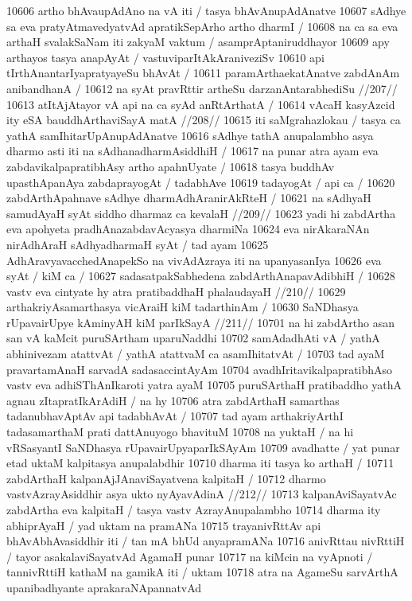 10606 artho bhAvaupAdAno na vA iti / tasya bhAvAnupAdAnatve  
10607 sAdhye sa eva pratyAtmavedyatvAd apratikSepArho artho dharmI /  
10608 na ca sa eva arthaH svalakSaNam iti zakyaM vaktum / asamprAptaniruddhayor
10609 apy arthayos tasya anapAyAt / vastuviparItAkAraniveziSv 
10610 api tIrthAnantarIyapratyayeSu bhAvAt /  
10611 	paramArthaekatAnatve zabdAnAm anibandhanA / 
10612 	na syAt pravRttir artheSu darzanAntarabhediSu //207//
10613 	atItAjAtayor vA api na ca syAd anRtArthatA / 
10614 	vAcaH kasyAzcid ity eSA bauddhArthaviSayA matA //208// 
10615 iti saMgrahazlokau / tasya ca yathA samIhitarUpAnupAdAnatve 
10616 sAdhye tathA anupalambho asya dharmo asti iti na sAdhanadharmAsiddhiH /
10617 na punar atra ayam eva zabdavikalpapratibhAsy artho apahnUyate /
10618 tasya buddhAv upasthApanAya zabdaprayogAt / tadabhAve  
10619 tadayogAt / api ca / 
10620 	zabdArthApahnave sAdhye dharmAdhAranirAkRteH /
10621 	na sAdhyaH samudAyaH syAt siddho dharmaz ca kevalaH //209// 
10623 yadi hi zabdArtha eva apohyeta pradhAnazabdavAcyasya dharmiNa 
10624 eva nirAkaraNAn nirAdhAraH sAdhyadharmaH syAt / tad ayam  
10625 AdhAravyavacchedAnapekSo na vivAdAzraya iti na upanyasanIya  
10626 eva syAt / kiM ca /
10627 	sadasatpakSabhedena zabdArthAnapavAdibhiH /
10628 	vastv eva cintyate hy atra pratibaddhaH phalaudayaH //210//
10629 	arthakriyAsamarthasya vicAraiH kiM tadarthinAm /  
10630 	SaNDhasya rUpavairUpye kAminyAH kiM parIkSayA //211//
10701 na hi zabdArtho asan san vA kaMcit puruSArtham uparuNaddhi  
10702 samAdadhAti vA / yathA abhinivezam atattvAt / yathA atattvaM ca asamIhitatvAt /
10703 tad ayaM pravartamAnaH sarvadA sadasaccintAyAm 
10704 avadhIritavikalpapratibhAso vastv eva adhiSThAnIkaroti yatra ayaM
10705 puruSArthaH pratibaddho yathA agnau zItapratIkArAdiH / na hy 
10706 atra zabdArthaH samarthas tadanubhavAptAv api tadabhAvAt /
10707 tad ayam arthakriyArthI tadasamarthaM prati dattAnuyogo bhavituM  
10708 na yuktaH / na hi vRSasyantI SaNDhasya rUpavairUpyaparIkSAyAm  
10709 avadhatte / yat punar etad uktaM kalpitasya anupalabdhir
10710 dharma iti tasya ko arthaH / 
10711 	zabdArthaH kalpanAjJAnaviSayatvena kalpitaH /
10712 	dharmo vastvAzrayAsiddhir asya ukto nyAyavAdinA //212// 
10713 kalpanAviSayatvAc zabdArtha eva kalpitaH / tasya vastv AzrayAnupalambho
10714 dharma ity abhiprAyaH / yad uktam na pramANa
10715 trayanivRttAv api bhAvAbhAvasiddhir iti / tan mA bhUd anyapramANa
10716 anivRttau nivRttiH / tayor asakalaviSayatvAd AgamaH punar  
10717 na kiMcin na vyApnoti / tannivRttiH kathaM na gamikA iti / uktam 
10718 atra na AgameSu sarvArthA upanibadhyante aprakaraNApannatvAd
